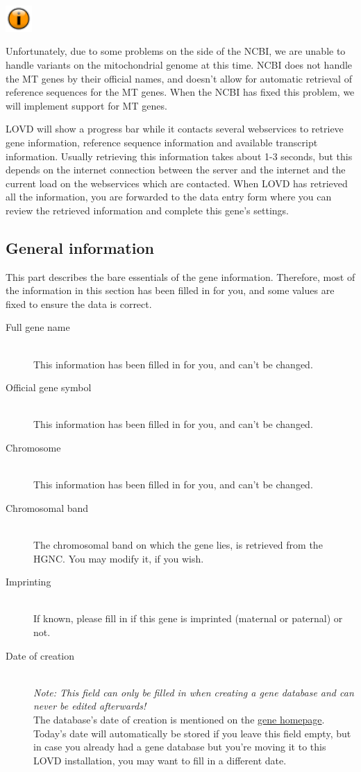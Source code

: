 \documentclass[a4paper,oneside,openany,12pt]{memoir}
\newlength{\infoboxlength}
\newlength{\infoboxinnerlength}
\newenvironment{infotable}
  {\begin{lrbox}{\infobox}%
    \begin{minipage}[t]{1.5cm}
      \centering
      \vspace{0pt}
      \includegraphics[width=1cm,height=1cm]{lovd_information.png}
    \end{minipage}
   \begin{minipage}[t]{\infoboxlength}\vspace{5pt}\begin{minipage}{\infoboxinnerlength}}
  {\vspace{6pt}\end{minipage}\end{minipage}\end{lrbox}%
   \begin{center}
   \fcolorbox{black}{LOVDlight}{\usebox{\infobox}}
   \end{center}}
\begin{document}
\begin{infotable}
Unfortunately, due to some problems on the side of the NCBI, we are unable to handle variants on the mitochondrial genome at this time.
NCBI does not handle the MT genes by their official names, and doesn't allow for automatic retrieval of reference sequences for the MT genes.
When the NCBI has fixed this problem, we will implement support for MT genes.
\end{infotable}

LOVD will show a progress bar while it contacts several webservices to retrieve gene information,
 reference sequence information and available transcript information.
Usually retrieving this information takes about 1-3 seconds, but this depends on the internet connection between
the server and the internet and the current load on the webservices which are contacted.
When LOVD has retrieved all the information, you are forwarded to the data entry form where
 you can review the retrieved information and complete this gene's settings.



\pagebreak[4] %
\subsection{General information}
This part describes the bare essentials of the gene information.
Therefore, most of the information in this section has been filled in for you, and some values are fixed to ensure the data is correct.
\begin{description}
  \item[Full gene name] \hfill \\
  This information has been filled in for you, and can't be changed.
  \item[Official gene symbol] \hfill \\
  This information has been filled in for you, and can't be changed.
  \item[Chromosome] \hfill \\
  This information has been filled in for you, and can't be changed.
  \item[Chromosomal band] \hfill \\
  The chromosomal band on which the gene lies, is retrieved from the HGNC.
  You may modify it, if you wish.
  \item[Imprinting] \hfill \\
  If known, please fill in if this gene is imprinted (maternal or paternal) or not.
  \item[Date of creation] \hfill \\
  \emph{Note: This field can only be filled in when creating a gene database and can never be edited afterwards!}
  \\
  The database's date of creation is mentioned on the \hyperlink{sec:gene_homepage}{gene homepage}.
  Today's date will automatically be stored if you leave this field empty, but in case you already
   had a gene database but you're moving it to this LOVD installation, you may want to fill in a different date.
\end{description}
\end{document}

